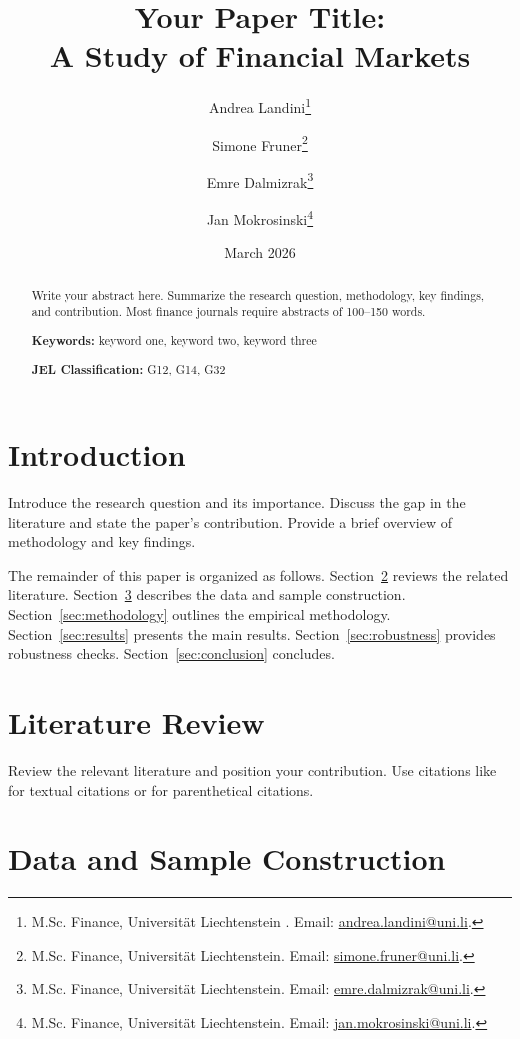 \documentclass[12pt,a4paper]{article}
\title{\textbf{Your Paper Title: \\ A Study of Financial Markets}}
\author{
  Andrea Landini\thanks{M.Sc. Finance, Universität Liechtenstein . Email: \href{mailto:andrea.landini@uni.li}{andrea.landini@uni.li}.} 
  \and 
  Simone Fruner\thanks{M.Sc. Finance, Universität Liechtenstein. Email: \href{mailto:simone.fruner@uni.li}{simone.fruner@uni.li}.} 
  \and 
  Emre Dalmizrak\thanks{M.Sc. Finance, Universität Liechtenstein. Email: \href{mailto:emre.dalmizrak@uni.li}{emre.dalmizrak@uni.li}.} 
  \and 
  Jan Mokrosinski\thanks{M.Sc. Finance, Universität Liechtenstein. Email: \href{mailto:jan.mokrosinski@uni.li}{jan.mokrosinski@uni.li}.} 
}
\date{March 2026}
\begin{document}
\maketitle
\thispagestyle{empty}

\begin{abstract}
\noindent
Write your abstract here. Summarize the research question, methodology, key findings, and contribution. Most finance journals require abstracts of 100--150 words.

\bigskip
\noindent
\textbf{Keywords:} keyword one, keyword two, keyword three

\bigskip
\noindent
\textbf{JEL Classification:} G12, G14, G32
\end{abstract}

\newpage
\setcounter{page}{1}

\section{Introduction}
\label{sec:introduction}

Introduce the research question and its importance. Discuss the gap in the literature and state the paper's contribution. Provide a brief overview of methodology and key findings.

The remainder of this paper is organized as follows. Section~\ref{sec:literature} reviews the related literature. Section~\ref{sec:data} describes the data and sample construction. Section~\ref{sec:methodology} outlines the empirical methodology. Section~\ref{sec:results} presents the main results. Section~\ref{sec:robustness} provides robustness checks. Section~\ref{sec:conclusion} concludes.

\section{Literature Review}
\label{sec:literature}

Review the relevant literature and position your contribution. Use citations like \citet{author2020} for textual citations or \citep{author2020} for parenthetical citations.

\section{Data and Sample Construction}
\label{sec:data}
\end{document}
